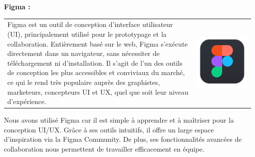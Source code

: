 \documentclass{article}
\begin{document}
\vspace{0,5cm}

\noindent \textbf{Figma \cite{figmainterface}: }

\noindent
\begin{tabular}
{@{}m{}@{\hspace{1em}}m{}@{}}
Figma est un outil de conception d’interface utilisateur (UI), principalement utilisé pour le prototypage et la collaboration. Entièrement basé sur le web, Figma s’exécute directement dans un navigateur, sans nécessiter de téléchargement ni d’installation.
Il s’agit de l’un des outils de conception les plus accessibles et conviviaux du marché, ce qui le rend très populaire auprès des graphistes, marketeurs, concepteurs UI et UX, quel que soit leur niveau d’expérience.\cite{figma}
&
\includegraphics[width=\linewidth]{Figma.png} %
\end{tabular}

\noindent Nous avons utilisé Figma car il est simple à apprendre et à maîtriser pour la conception UI/UX. Grâce à ses outils intuitifs, il offre un large espace d’inspiration via la Figma Community. De plus, ses fonctionnalités avancées de collaboration nous permettent de travailler efficacement en équipe.
\end{document}
